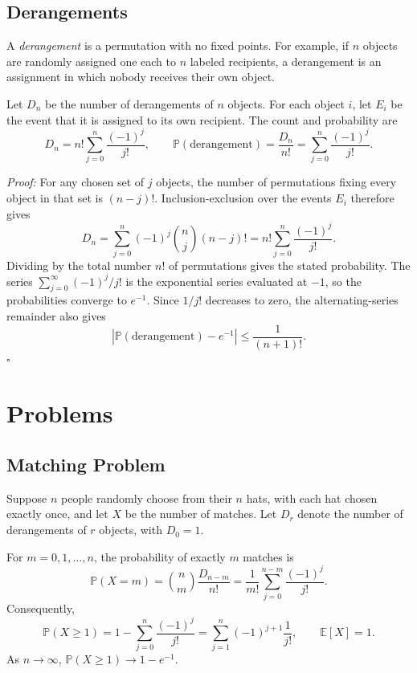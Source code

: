 \documentclass[a4paper,11pt,abstracton]{scrartcl}
\theoremstyle{dotlessP}
\theoremstyle{dotlessS}
\theoremstyle{remark}
\theoremstyle{definition}
\begin{document}
\subsection{Derangements}

A \emph{derangement} is a permutation with no fixed points. For example, if $n$ objects are randomly assigned one each to $n$ labeled recipients, a derangement is an assignment in which nobody receives their own object.

Let $D_n$ be the number of derangements of $n$ objects. For each object $i$, let $E_i$ be the event that it is assigned to its own recipient. The count and probability are
\[
  D_n=n!\sum_{j=0}^{n}\frac{(-1)^j}{j!},
  \qquad
  \mathbb{P}(\text{derangement})=\frac{D_n}{n!}
  =\sum_{j=0}^{n}\frac{(-1)^j}{j!}.
\]
\begin{claim_box}
\textit{Proof:} For any chosen set of $j$ objects, the number of permutations fixing every object in that set is $(n-j)!$. Inclusion-exclusion over the events $E_i$ therefore gives
\[
  D_n=\sum_{j=0}^{n}(-1)^j\binom{n}{j}(n-j)!
  =n!\sum_{j=0}^{n}\frac{(-1)^j}{j!}.
\]
Dividing by the total number $n!$ of permutations gives the stated probability. The series $\sum_{j=0}^{\infty}(-1)^j/j!$ is the exponential series evaluated at $-1$, so the probabilities converge to $e^{-1}$. Since $1/j!$ decreases to zero, the alternating-series remainder also gives
\[
  \left|\mathbb{P}(\text{derangement})-e^{-1}\right|\leq\frac{1}{(n+1)!}.
\]
\hfill$\square$
\end{claim_box}

\section{Problems}

\subsection{Matching Problem}

Suppose $n$ people randomly choose from their $n$ hats, with each hat chosen exactly once, and let $X$ be the number of matches. Let $D_r$ denote the number of derangements of $r$ objects, with $D_0=1$.

\begin{problem_box}
For $m=0,1,\ldots,n$, the probability of exactly $m$ matches is
\[
  \mathbb{P}(X=m)
  =\binom{n}{m}\frac{D_{n-m}}{n!}
  =\frac{1}{m!}\sum_{j=0}^{n-m}\frac{(-1)^j}{j!}.
\]
Consequently,
\[
  \mathbb{P}(X\geq1)
  =1-\sum_{j=0}^{n}\frac{(-1)^j}{j!}
  =\sum_{j=1}^{n}(-1)^{j+1}\frac{1}{j!},
  \qquad \mathbb{E}[X]=1.
\]
As $n\to\infty$, $\mathbb{P}(X\geq1)\to1-e^{-1}$.
\end{problem_box}
\end{document}
